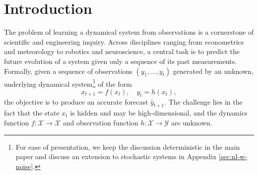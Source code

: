 \documentclass[11pt]{article}
\def\R{{\mathcal R}}
\def\R{\ensuremath{\mathcal R}}
\numberwithin{equation}{section}
\begin{document}
\begin{abstract}
We study the fundamental problem of learning a marginally stable unknown nonlinear dynamical system. We describe an algorithm for this problem, based on the technique of spectral filtering, which learns a mapping from past observations to the next based on a spectral representation of the system. Using techniques from online convex optimization, we prove vanishing prediction error for any nonlinear dynamical system that has finitely many marginally stable modes, with rates governed by a novel quantitative control-theoretic notion of learnability. The main technical component of our method is a new spectral filtering algorithm for linear dynamical systems, which incorporates past observations and applies to general noisy and marginally stable systems. This significantly generalizes the original spectral filtering algorithm to both asymmetric dynamics as well as incorporating noise correction, and is of independent interest.


\end{abstract}


\section{Introduction}\label{sec:1-introduction}


\renewcommand{\R}{\mathbb{R}}

The problem of learning a dynamical system from observations is a cornerstone of scientific and engineering inquiry. Across disciplines ranging from econometrics and meteorology to robotics and neuroscience, a central task is to predict the future evolution of a system given only a sequence of its past measurements. Formally, given a sequence of observations  $(y_1, ...,y_t)$ generated by an unknown, underlying
dynamical system\footnote{For ease of presentation, we keep the discussion deterministic in the main paper and discuss an extension to stochastic systems in Appendix \ref{sec:nl-w-noise}.} of the form 
\begin{equation}
    \label{eqn:NLDS}
    x_{t+1} = f(x_t), \quad y_t = h(x_t) ,
\end{equation}
the objective is to produce an accurate forecast $\hat{y}_{t+1}$. The challenge lies in the fact that the state $x_t$ is hidden and may be high-dimensional, and the dynamics function $f: \mathcal{X} \to \mathcal{X}$ and observation function $h: \mathcal{X} \to \mathcal{Y}$ are unknown.
\end{document}
